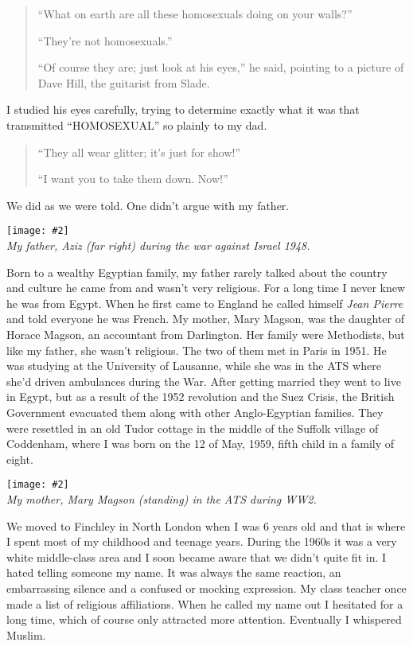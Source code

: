 \documentclass[12pt]{memoir}
\newcommand{\img}[3]{\begin{center}%
\texttt{[image: \#2]}\\{\small\em#3}%
\end{center}}
\begin{document}
\begin{quote}
“What on earth are all these homosexuals doing on your walls?”

“They’re not homosexuals.”

“Of course they are; just look at his eyes,”
he said, pointing to a picture of Dave Hill, the guitarist from Slade.
\end{quote}

I studied his eyes carefully, trying to determine exactly what it was
that transmitted “HOMOSEXUAL” so plainly to my dad.

\begin{quote}
“They all wear glitter; it’s just for show!”

“I want you to take them down. Now!”
\end{quote}

We did as we were told.
One didn’t argue with my father.

\img{scale=0.8}{Hassans_Father.jpg}
{My father, Aziz (far right) during the war against Israel 1948.}

Born to a wealthy Egyptian family,
my father rarely talked about the country
and culture he came from and wasn’t very religious.
For a long time I never knew he was from Egypt.
When he first came to England he called himself \emph{Jean Pierre}
and told everyone he was French.
My mother, Mary Magson, was the daughter of Horace Magson,
an accountant from Darlington.
Her family were Methodists, but like my father, she wasn’t religious.
The two of them met in Paris in 1951.
He was studying at the University of Lausanne,
while she was in the ATS where she’d driven ambulances during the War.
After getting married they went to live in Egypt,
but as a result of the 1952 revolution and the Suez Crisis,
the British Government evacuated them
along with other Anglo-Egyptian families.
They were resettled in an old Tudor cottage in the middle
of the Suffolk village of Coddenham,
where I was born on the 12 of May, 1959,
fifth child in a family of eight.

\img{scale=0.7}{Hassans_Mother.jpg}
{My mother, Mary Magson (standing) in the ATS during WW2.}

We moved to Finchley in North London when I was 6 years old
and that is where I spent most of my childhood and teenage years.
During the 1960s it was a very white middle-class area
and I soon became aware that we didn’t quite fit in.
I hated telling someone my name.
It was always the same reaction,
an embarrassing silence and a confused or mocking expression.
My class teacher once made a list of religious affiliations.
When he called my name out I hesitated for a long time,
which of course only attracted more attention.
Eventually I whispered Muslim.
\end{document}
